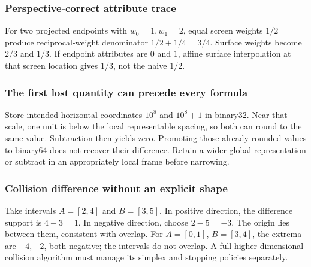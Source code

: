 \subsubsection{Perspective-correct attribute trace}\label{appendix-92ff77d4dfdc-perspective-correct-attribute-trace}

\hypertarget{appendix-92ff77d4dfdc-perspective-correct-attribute-trace}{}

For two projected endpoints with \(w_0=1,w_1=2\), equal screen weights \(1/2\) produce reciprocal-weight denominator \(1/2+1/4=3/4\). Surface weights become \(2/3\) and \(1/3\). If endpoint attributes are \(0\) and \(1\), affine surface interpolation at that screen location gives \(1/3\), not the naive \(1/2\).

\subsubsection{The first lost quantity can precede every formula}\label{appendix-92ff77d4dfdc-the-first-lost-quantity-can-precede-every-formula}

\hypertarget{appendix-92ff77d4dfdc-the-first-lost-quantity-can-precede-every-formula}{}

Store intended horizontal coordinates \(10^8\) and \(10^8+1\) in binary32. Near that scale, one unit is below the local representable spacing, so both can round to the same value. Subtraction then yields zero. Promoting those already-rounded values to binary64 does not recover their difference. Retain a wider global representation or subtract in an appropriately local frame before narrowing.

\subsubsection{Collision difference without an explicit shape}\label{appendix-92ff77d4dfdc-collision-difference-without-an-explicit-shape}

\hypertarget{appendix-92ff77d4dfdc-collision-difference-without-an-explicit-shape}{}

Take intervals \(A=[2,4]\) and \(B=[3,5]\). In positive direction, the difference support is \(4-3=1\). In negative direction, choose \(2-5=-3\). The origin lies between them, consistent with overlap. For \(A=[0,1]\), \(B=[3,4]\), the extrema are \(-4,-2\), both negative; the intervals do not overlap. A full higher-dimensional collision algorithm must manage its simplex and stopping policies separately.

